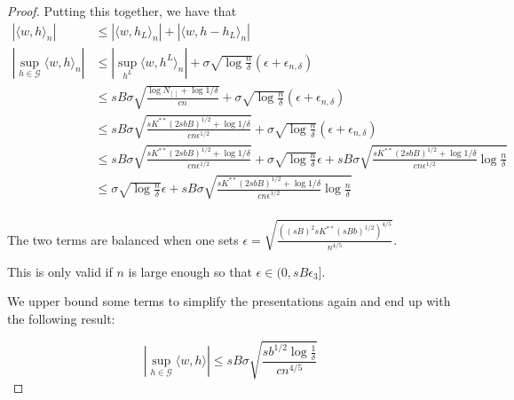 \begin{proof}
Putting this together, we have that
\begin{align*}
|\langle w, h \rangle_n | &\leq | \langle w, h_L\rangle_n| + |\langle w, h - h_L\rangle_n|\\
|\sup_{h \in \mathcal{G}} \langle w, h \rangle_n| &\leq 
     | \sup_{h^L} \langle w, h^L \rangle_n | + \sigma \sqrt{\log \frac{n}{\delta}} (\epsilon + \epsilon_{n, \delta}) \\
   &\leq   sB \sigma \sqrt{ \frac{ \log N_{[]} + \log 1/\delta}{cn}} + \sigma \sqrt{\log \frac{n}{\delta}} (\epsilon + \epsilon_{n, \delta}) \\
   &\leq  sB \sigma \sqrt{ \frac{sK^{**} (2sbB)^{1/2} + \log 1/\delta}{cn \epsilon^{1/2}}} +
   \sigma \sqrt{ \log \frac{n}{\delta}} (\epsilon + \epsilon_{n, \delta}) \\
   &\leq sB \sigma \sqrt{ \frac{sK^{**} (2sbB)^{1/2} + \log 1/\delta}{cn \epsilon^{1/2}}} +
   \sigma\sqrt{\log \frac{n}{\delta}} \epsilon + sB \sigma \sqrt{ \frac{sK^{**} (2sbB)^{1/2} + \log 1/\delta}{cn \epsilon^{1/2}} \log \frac{n}{\delta}} \\
   &\leq \sigma\sqrt{\log \frac{n}{\delta}} \epsilon + sB \sigma \sqrt{ \frac{sK^{**} (2sbB)^{1/2} + \log 1/\delta}{cn \epsilon^{1/2}} \log \frac{n}{\delta}} \\
\end{align*}

The two terms are balanced when one sets $\epsilon = \sqrt{ \frac{((sB)^2 s K^{**} (sBb)^{1/2})^{4/5}}{n^{4/5}} }$.  

This is only valid if $n$ is large enough so that $\epsilon \in (0, sB \epsilon_3]$.

We upper bound some terms to simplify the presentations again and end up with the following result:

\[
|\sup_{h \in \mathcal{G}} \langle w, h \rangle | \leq sB \sigma \sqrt{ 
   \frac{s b^{1/2} \log \frac{1}{\delta}}{c n^{4/5}}}
\]





\end{proof}
